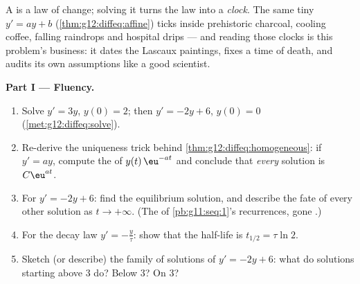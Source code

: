 \begin{problem}
\label{pb:g12:diffeq:1}
A  is a law of change; solving it turns the
law into a \emph{clock}. The same tiny 
$y' = ay + b$ (\cref{thm:g12:diffeq:affine}) ticks inside
prehistoric charcoal, cooling coffee, falling raindrops and
hospital drips --- and reading those clocks is this problem's
business: it dates the Lascaux paintings, fixes a time of death,
and audits its own assumptions like a good scientist.

\medskip
\noindent\textbf{Part I --- Fluency.}
\begin{enumerate}
  \item Solve $y' = 3y$, $y(0) = 2$; then
        $y' = -2y + 6$, $y(0) = 0$
        (\cref{met:g12:diffeq:solve}).
  \item Re-derive the uniqueness trick behind
        \cref{thm:g12:diffeq:homogeneous}: if $y' = ay$, compute
        the  of $y(t)\,\eu^{-at}$ and conclude that
        \emph{every} solution is $C\eu^{at}$.
  \item For $y' = -2y + 6$: find the equilibrium solution, and
        describe the fate of every other solution as
        $t \to +\infty$. (The  of
        \cref{pb:g11:seq:1}'s recurrences, gone .)
  \item For the decay law $y' = -\frac{y}{\tau}$: show that the
        half-life is $t_{1/2} = \tau \ln 2$.
  \item Sketch (or describe) the family of solutions of
        $y' = -2y + 6$: what do solutions starting above $3$
        do? Below $3$? On $3$?
\end{enumerate}


\end{problem}
